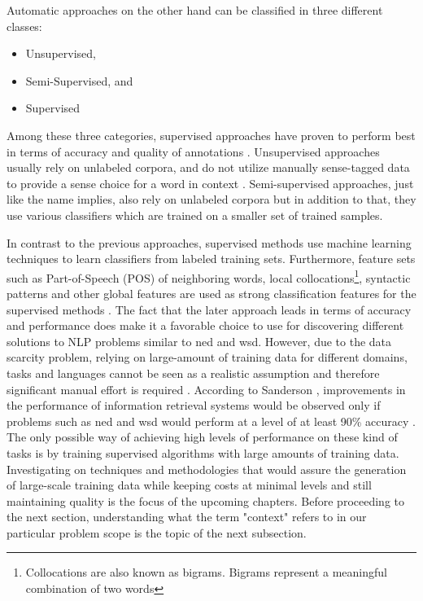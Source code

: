Automatic approaches on the other hand can be classified in three different classes: 
\begin{itemize}
    \item Unsupervised,
    \item Semi-Supervised, and
    \item Supervised
\end{itemize}

Among these three categories, supervised approaches have proven to perform best in terms of accuracy and quality of annotations \cite{29}. Unsupervised approaches usually rely on unlabeled corpora, and do not utilize manually sense-tagged data to provide a sense choice for a word in context \cite{30}. Semi-supervised approaches, just like the name implies, also rely on unlabeled corpora but in addition to that, they use various classifiers which are trained on a smaller set of trained samples. 

In contrast to the previous approaches, supervised methods use machine learning techniques to learn classifiers from labeled training sets. Furthermore, feature sets such as Part-of-Speech (POS) of neighboring words, local collocations\footnote{Collocations are also known as bigrams. Bigrams represent a meaningful combination of two words}, syntactic patterns and other global features are used as strong classification features for the supervised methods \cite{27}. The fact that the later approach leads in terms of accuracy and performance does make it a favorable choice to use for discovering different solutions to NLP problems similar to \ac{ned} and \ac{wsd}. However, due to the data scarcity problem, relying on large-amount of training data for different domains, tasks and languages cannot be seen as a realistic assumption and therefore significant manual effort is required \cite{30}. According to Sanderson \cite{sanderson1994}, improvements in the performance of information retrieval systems would be observed only if problems such as \ac{ned} and \ac{wsd} would perform at a level of at least 90\% accuracy \cite{sanderson1994,30}. The only possible way of achieving high levels of performance on these kind of tasks is by training supervised algorithms with large amounts of training data. Investigating on techniques and methodologies that would assure the generation of large-scale training data while keeping costs at minimal levels and still maintaining quality is the focus of the upcoming chapters. Before proceeding to the next section, understanding what the term "context" refers to in our particular problem scope is the topic of the next subsection.

